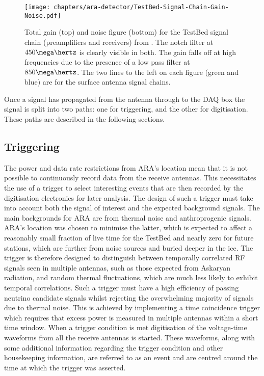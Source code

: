 \begin{figure}[htpb]
  \centering
  \texttt{[image: chapters/ara-detector/TestBed-Signal-Chain-Gain-Noise.pdf]}
  \caption{Total gain (top) and noise figure (bottom) for the TestBed signal chain (preamplifiers and receivers) from \cite{Allison2012457}. The notch filter at $450 \mega\hertz$ is clearly visible in both. The gain falls off at high frequencies due to the presence of a low pass filter at $850 \mega \hertz$. The two lines to the left on each figure (green and blue) are for the surface antenna signal chains.}
  \label{fig:ara-detector:TestBed:Signal-Chain:Gain-Noise}
\end{figure}

Once a signal has propagated from the antenna through to the DAQ box the signal is split into two paths: one for triggering, and the other for digitisation. These paths are described in the following sections.

\subsection{Triggering}
\label{sec:ara-detector:TestBed:Triggering}

The power and data rate restrictions from ARA's location mean that it is not possible to continuously record data from the receive antennas. This necessitates the use of a trigger to select interesting events that are then recorded by the digitisation electronics for later analysis. The design of such a trigger must take into account both the signal of interest and the expected background signals. The main backgrounds for ARA are from thermal noise and anthroprogenic signals. ARA's location was chosen to minimise the latter, which is expected to affect a reasonably small fraction of live time for the TestBed and nearly zero for future stations, which are further from noise sources and buried deeper in the ice. The trigger is therefore designed to distinguish between temporally correlated RF signals seen in multiple antennas, such as those expected from Askaryan radiation, and random thermal fluctuations, which are much less likely to exhibit temporal correlations. Such a trigger must have a high efficiency of passing neutrino candidate signals whilst rejecting the overwhelming majority of signals due to thermal noise. This is achieved by implementing a time coincidence trigger which requires that excess power is measured in multiple antennas within a short time window. When a trigger condition is met digitisation of the voltage-time waveforms from all the receive antennas is started. These waveforms, along with some additional information regarding the trigger condition and other housekeeping information, are referred to as an event and are centred around the time at which the trigger was asserted.

